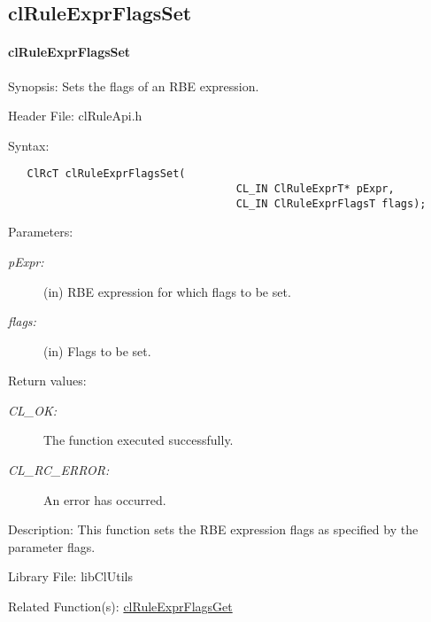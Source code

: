 \begin{flushleft}
\subsection{clRuleExprFlagsSet}
\hypertarget{pagerule109}{}\paragraph{cl\-Rule\-Expr\-Flags\-Set}\label{pagerule109}
\begin{Desc}
\item[Synopsis:]Sets the flags of an RBE expression.\end{Desc}
\begin{Desc}
\item[Header File:]clRuleApi.h\end{Desc}
\begin{Desc}
\item[Syntax:]

\footnotesize\begin{verbatim}   ClRcT clRuleExprFlagsSet(
                              		CL_IN ClRuleExprT* pExpr,
                              		CL_IN ClRuleExprFlagsT flags);
\end{verbatim}
\normalsize
\end{Desc}
\begin{Desc}
\item[Parameters:]
\begin{description}
\item[{\em p\-Expr:}](in) RBE expression for which flags to be set. \item[{\em flags:}](in) Flags to be set.\end{description}
\end{Desc}
\begin{Desc}
\item[Return values:]
\begin{description}
\item[{\em CL\_\-OK:}]The function executed successfully. \item[{\em CL\_\-RC\_\-ERROR:}]An error has occurred.\end{description}
\end{Desc}
\begin{Desc}
\item[Description:]This function sets the RBE expression flags as specified by the parameter flags.\end{Desc}
\begin{Desc}
\item[Library File:]lib\-Cl\-Utils\end{Desc}
\begin{Desc}
\item[Related Function(s):]\hyperlink{pagerule113}{cl\-Rule\-Expr\-Flags\-Get} \end{Desc}
\newpage



\end{flushleft}
